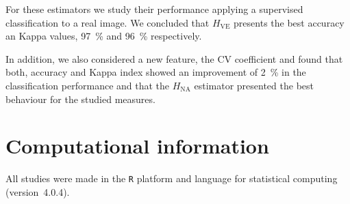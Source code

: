 \documentclass[journal]{IEEEtran}
\begin{document}
For these estimators we study their performance applying a supervised classification to a real image. We concluded that $H_{\text{VE}}$ presents the best accuracy an Kappa values, \SI{97}{\percent} and \SI{96}{\percent} respectively. 

In addition, we also considered a new feature, the CV coefficient and found that both,  accuracy and Kappa index showed an improvement  of \SI{2}{\percent} in the classification performance and that the $H_{\text{NA}}$ estimator presented the best behaviour for the studied measures.

\section{Computational information}
\label{conclusion}
	
All studies were made in the \texttt R platform and language for statistical computing~\cite{RLanguage} (version~4.0.4).
	




	
\end{document}
